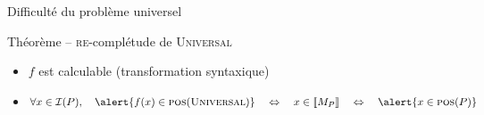 \begin{frame}{Difficulté du problème universel}
\begin{block}{Théorème -- \textsc{re}-complétude de \textsc{Universal}}
    \begin{itemize}
    \item\vspace{-2mm} $f$ est calculable (transformation syntaxique)
    \item $\forall x \in \mathcal{I}(P), \quad
      \alert{f(x) \in \textsc{pos}(\textsc{Universal})}
      \quad\Leftrightarrow \quad
      x \in \llbracket M_P \rrbracket
      \quad\Leftrightarrow\quad
      \alert{x \in \textsc{pos}(P)}$
    \end{itemize}
  \end{block}

\end{frame}

\endgroup
\endinput
